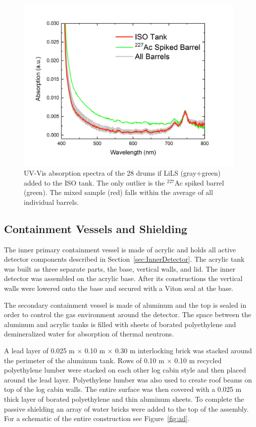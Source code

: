 \begin{figure}[h]
	\centering
	\includegraphics[width=0.6\linewidth]{tex/4-prospect-images/LiLS}
	\caption[LiLS UV-Vis absorption spectra]{UV-Vis absorption spectra of the 28 drums if LiLS (gray+green) added to the ISO tank. The only outlier is the $^{227}$Ac spiked barrel (green). The mixed sample (red) falls within the average of all individual barrels.}
	\label{fig:lils}
\end{figure}


\subsection{Containment Vessels and Shielding} \label{sec:shielding}

The inner primary containment vessel is made of acrylic and holds all active detector components described in Section~\ref{sec:InnerDetector}. 
The acrylic tank was built as three separate parts, the base, vertical walls, and lid. 
The inner detector was assembled on the acrylic base. After its constructions the vertical walls were lowered onto the base and secured with a Viton seal at the base. 

The secondary containment vessel is made of aluminum and the top is sealed in order to control the gas environment around the detector.
The space between the aluminum and acrylic tanks is filled with sheets of borated polyethylene and demineralized water for absorption of thermal neutrons.

A lead layer of 0.025 m $\times$ 0.10 m $\times$ 0.30 m interlocking brick was stacked around the perimeter of the aluminum tank. 
Rows of 0.10 m $\times$ 0.10 m recycled polyethylene lumber were stacked on each other log cabin style and then placed around the lead layer.
Polyethylene lumber was also used to create roof beams on top of the log cabin walls.
The entire surface was then covered with a 0.025 m thick layer of borated polyethylene and thin aluminum sheets. 
To complete the passive shielding an array of water bricks were added to the top of the assembly. 
For a schematic of the entire construction see Figure~\ref{fig:ad}.



